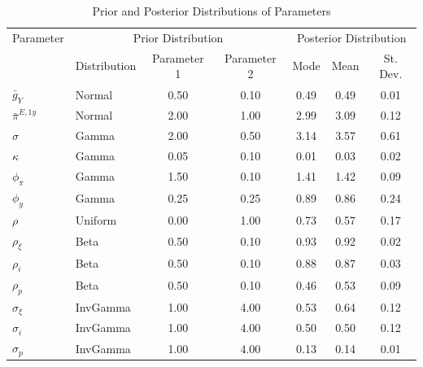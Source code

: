 \begin{table}
	\caption{Prior and Posterior Distributions of Parameters}
	\begin{center}
\begin{tabularx}{0.8\textwidth}{llccccc} 
\hline 
Parameter& \multicolumn{3}{c}{Prior Distribution} & \multicolumn{3}{c}{Posterior Distribution} \\ 
& Distribution &Parameter 1& Parameter 2& Mode & Mean & St. Dev.\\ 
\hline 
$\bar{g}_Y             $ & Normal                                                       & 0.50& 0.10& 0.49& 0.49& 0.01  \\ 
$\bar{\pi}^{E,1y}         $ & Normal                                                       & 2.00& 1.00& 2.99& 3.09& 0.12  \\ 
$\sigma                $ & Gamma                                                        & 2.00& 0.50& 3.14& 3.57& 0.61  \\ 
$\kappa                $ & Gamma                                                        & 0.05& 0.10& 0.01& 0.03& 0.02  \\ 
$\phi_\pi              $ & Gamma                                                        & 1.50& 0.10& 1.41& 1.42& 0.09  \\ 
$\phi_y                $ & Gamma                                                        & 0.25& 0.25& 0.89& 0.86& 0.24  \\ 
$\rho                  $ & Uniform                                                      & 0.00& 1.00& 0.73& 0.57& 0.17  \\ 
$\rho_\xi              $ & Beta                                                         & 0.50& 0.10& 0.93& 0.92& 0.02  \\ 
$\rho_i                $ & Beta                                                         & 0.50& 0.10& 0.88& 0.87& 0.03  \\ 
$\rho_p                $ & Beta                                                         & 0.50& 0.10& 0.46& 0.53& 0.09  \\ 
$\sigma_\xi            $ & InvGamma                                                     & 1.00& 4.00& 0.53& 0.64& 0.12  \\ 
$\sigma_i              $ & InvGamma                                                     & 1.00& 4.00& 0.50& 0.50& 0.12  \\ 
$\sigma_p              $ & InvGamma                                                     & 1.00& 4.00& 0.13& 0.14& 0.01  \\ 

\end{tabularx}
\end{center}
\end{table}
